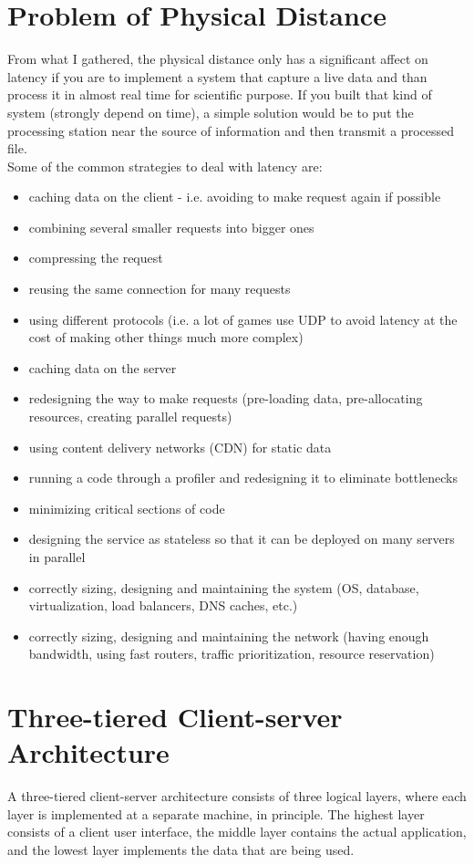 \documentclass[11pt,a4paper]{report}
\begin{document}
  	\section{Problem of Physical Distance}
  		From what I gathered, the physical distance only has a significant affect on latency if you are to implement a system that capture a live data and than process it in almost real time for scientific purpose. If you built that kind of system (strongly depend on time), a simple solution would be to put the processing station near the source of information and then transmit a processed file.\\
  		Some of the common strategies to deal with latency are:
  		\begin{itemize}
  			\item caching data on the client - i.e. avoiding to make request again if possible
    		\item combining several smaller requests into bigger ones
    		\item compressing the request
    		\item reusing the same connection for many requests
    		\item using different protocols (i.e. a lot of games use UDP to avoid latency at the cost of making other things much more complex)
    		\item caching data on the server
    		\item redesigning the way to make requests (pre-loading data, pre-allocating resources, creating parallel requests)
    		\item using content delivery networks (CDN) for static data
    		\item running a code through a profiler and redesigning it to eliminate bottlenecks
    		\item minimizing critical sections of code
    		\item designing the service as stateless so that it can be deployed on many servers in parallel
    		\item correctly sizing, designing and maintaining the system (OS, database, virtualization, load balancers, DNS caches, etc.)
    		\item correctly sizing, designing and maintaining the network (having enough bandwidth, using fast routers, traffic prioritization, resource reservation)
  		\end{itemize}
  	\section{Three-tiered Client-server Architecture}
  		A three-tiered client-server architecture consists of three logical layers, where each layer is implemented at a separate machine, in principle. The highest layer consists of a client user interface, the middle layer contains the actual application, and the lowest layer implements the data that are being used.
\end{document}
